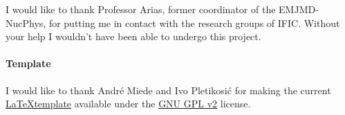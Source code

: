 I would like to thank Professor Arias, former coordinator of the \ac{EMJMD-NucPhys}, for putting me in contact with the research groups of \ac{IFIC}. Without your help I wouldn't have been able to undergo this project.

\bigskip

\paragraph*{Template}

I would like to thank Andr\'e Miede and Ivo Pletikosić for making the current \href{https://bitbucket.org/amiede/classicthesis/}{\LaTeX template} available under the \href{https://www.gnu.org/licenses/old-licenses/gpl-2.0.en.html}{GNU GPL v2} license.


\endgroup
